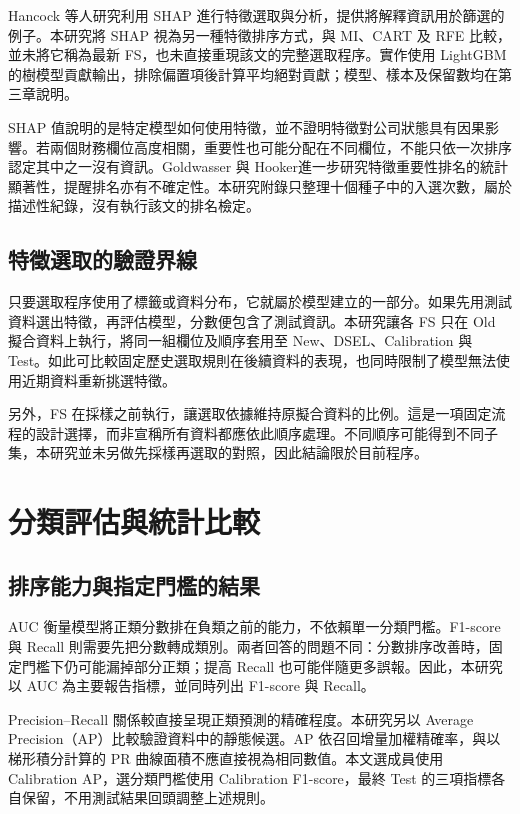 Hancock 等人\autocite{hancock2025shapfs}研究利用 SHAP 進行特徵選取與分析，提供將解釋資訊用於篩選的例子。本研究將 SHAP 視為另一種特徵排序方式，與 MI、CART 及 RFE 比較，並未將它稱為最新 FS，也未直接重現該文的完整選取程序。實作使用 LightGBM 的樹模型貢獻輸出，排除偏置項後計算平均絕對貢獻；模型、樣本及保留數均在第三章說明。

SHAP 值說明的是特定模型如何使用特徵，並不證明特徵對公司狀態具有因果影響。若兩個財務欄位高度相關，重要性也可能分配在不同欄位，不能只依一次排序認定其中之一沒有資訊。Goldwasser 與 Hooker\autocite{goldwasser2025rankings}進一步研究特徵重要性排名的統計顯著性，提醒排名亦有不確定性。本研究附錄只整理十個種子中的入選次數，屬於描述性紀錄，沒有執行該文的排名檢定。

\subsection{特徵選取的驗證界線}

只要選取程序使用了標籤或資料分布，它就屬於模型建立的一部分。如果先用測試資料選出特徵，再評估模型，分數便包含了測試資訊。本研究讓各 FS 只在 Old 擬合資料上執行，將同一組欄位及順序套用至 New、DSEL、Calibration 與 Test。如此可比較固定歷史選取規則在後續資料的表現，也同時限制了模型無法使用近期資料重新挑選特徵。

另外，FS 在採樣之前執行，讓選取依據維持原擬合資料的比例。這是一項固定流程的設計選擇，而非宣稱所有資料都應依此順序處理。不同順序可能得到不同子集，本研究並未另做先採樣再選取的對照，因此結論限於目前程序。

\section{分類評估與統計比較}

\subsection{排序能力與指定門檻的結果}

AUC 衡量模型將正類分數排在負類之前的能力，不依賴單一分類門檻。F1-score 與 Recall 則需要先把分數轉成類別。兩者回答的問題不同：分數排序改善時，固定門檻下仍可能漏掉部分正類；提高 Recall 也可能伴隨更多誤報。因此，本研究以 AUC 為主要報告指標，並同時列出 F1-score 與 Recall。

Precision--Recall 關係較直接呈現正類預測的精確程度\autocite{saito2015pr}。本研究另以 Average Precision（AP）比較驗證資料中的靜態候選。AP 依召回增量加權精確率，與以梯形積分計算的 PR 曲線面積不應直接視為相同數值\autocite{sklearn-ap-docs}。本文選成員使用 Calibration AP，選分類門檻使用 Calibration F1-score，最終 Test 的三項指標各自保留，不用測試結果回頭調整上述規則。

